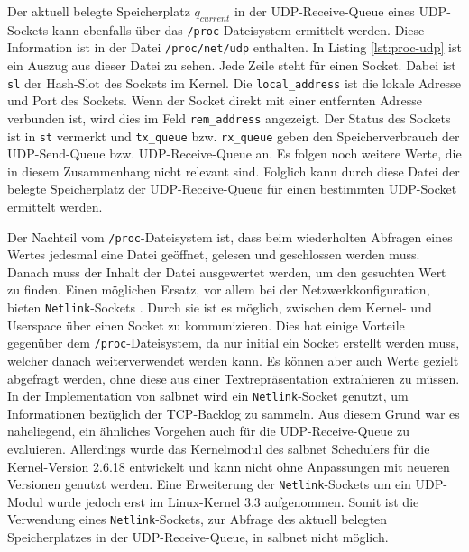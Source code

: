 \documentclass[a4paper, 12pt, BCOR10mm, DIV12, toc=bibliography, toc=listof, german]{scrbook}
\begin{document}
		Der aktuell belegte Speicherplatz $q_{current}$ in der UDP-Receive-Queue eines UDP-Sockets kann
		ebenfalls über das \texttt{/proc}-Dateisystem ermittelt werden. Diese Information ist in der
		Datei \texttt{/proc/net/udp} enthalten. In Listing \ref{lst:proc-udp} ist ein Auszug aus dieser
		Datei zu sehen. Jede Zeile steht für einen Socket. Dabei ist \texttt{sl} der Hash-Slot des
		Sockets im Kernel. Die \texttt{local\_address} ist die lokale Adresse und Port des Sockets. Wenn
		der Socket direkt  mit einer entfernten Adresse verbunden ist, wird dies im Feld
		\texttt{rem\_address} angezeigt.  Der Status des Sockets ist in \texttt{st} vermerkt und
		\texttt{tx\_queue} bzw.  \texttt{rx\_queue} geben den Speicherverbrauch der UDP-Send-Queue bzw.
		UDP-Receive-Queue an. Es folgen noch weitere Werte, die in diesem Zusammenhang nicht relevant
		sind. Folglich kann durch diese Datei der belegte Speicherplatz der UDP-Receive-Queue für einen
		bestimmten UDP-Socket ermittelt werden.

		Der Nachteil vom \texttt{/proc}-Dateisystem ist, dass beim wiederholten Abfragen eines Wertes
		jedesmal eine Datei geöffnet, gelesen und geschlossen werden muss. Danach muss der Inhalt der
		Datei ausgewertet werden, um den gesuchten Wert zu finden. Einen möglichen Ersatz, vor allem bei
		der Netzwerkkonfiguration, bieten \texttt{Netlink}-Sockets \cite{rfc3549, gusowski2009}.  Durch
		sie ist es möglich, zwischen dem Kernel- und Userspace über einen Socket zu kommunizieren.  Dies
		hat einige Vorteile gegenüber dem \texttt{/proc}-Dateisystem, da nur initial ein Socket erstellt
		werden muss, welcher danach weiterverwendet werden kann. Es können aber auch Werte gezielt
		abgefragt werden, ohne diese aus einer Textrepräsentation extrahieren zu müssen. In der
		Implementation von salbnet \cite{zinke2012,salbnet} wird ein \texttt{Netlink}-Socket genutzt, um
		Informationen bezüglich der TCP-Backlog zu sammeln. Aus diesem Grund war es naheliegend, ein
		ähnliches Vorgehen auch für die UDP-Receive-Queue zu evaluieren. Allerdings wurde das
		Kernelmodul des salbnet Schedulers für die Kernel-Version 2.6.18 entwickelt und kann nicht ohne
		Anpassungen mit neueren Versionen genutzt werden. Eine Erweiterung der \texttt{Netlink}-Sockets
		um ein UDP-Modul \cite{udpnetlink} wurde jedoch erst im Linux-Kernel 3.3 aufgenommen. Somit ist
		die Verwendung eines \texttt{Netlink}-Sockets, zur Abfrage des aktuell belegten Speicherplatzes
		in der UDP-Receive-Queue, in salbnet nicht möglich.

		
\end{document}
